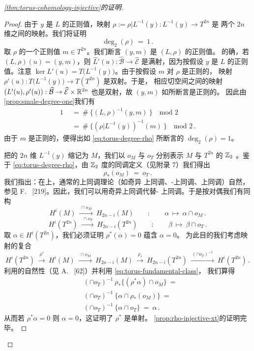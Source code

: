 \begin{proof}[\cref*{thm:torus-cohomology-injective}的证明]
\begin{proof}
由于 $y$ 是 $L$ 的正则值，映射 $\rho:=\rho|L^{-1}(y):L^{-1}(y)\to T^{2n}$ 是%
两个 $2n$ 维\trCompact\trManifold{}之间的映射。我们将证明
\begin{equation}\label{eq:torus-degree-rho}
\deg_{2}(\rho)\ =\ 1\,.
\end{equation}
取 $\rho$ 的一个正则值 $m\in T^{2n}$。我们断言 $(y,m)$ 是 $(L,\rho)$ 的正则值。%
的确，若 $(L,\rho)(u)=(y,m)$，则 $\widehat{L}'(u):\widehat{\mathcal{B}}\to%
\widehat{\mathcal{E}}$ 是满射，因为按假设 $y$ 是 $L$ 的正则值。注意%
$\ker L'(u)=T\bigl(L^{-1}(y)\bigr)$。由于按假设 $m$ 对 $\rho$ 是正则的，%
\trLinear{}映射 $\rho'(u):T\bigl(L^{-1}(y)\bigr)\to T(T^{2n})$ 是双射。于是，%
相应切空间之间的\trLinear{}映射 $(L'(u),\rho'(u)):\widehat{\mathcal{B}}\to%
\widehat{\mathcal{E}}\times\R^{2n}$ 也是双射，故 $(y,m)$ 如所断言是正则的。%
因此由\cref{prop:smale-degree-one}我们有
\[
\begin{aligned}
1\ \ &=\ \#\ \bigl\{(L,\rho)^{-1}(y,m)\ \bigr\}\quad\text{mod }2\\
&=\ \#\ \bigl\{(\rho|L^{-1}(y))^{-1}(m)\ \bigr\}\quad\text{mod }2\,.
\end{aligned}
\]
由于 $m$ 是正则的，便得出如 \eqref{eq:torus-degree-rho} 所断言的%
$\deg_{2}(\rho)=1$。

把\trCompact{}的 $2n$ 维\trManifold{} $L^{-1}(y)$ 缩记为 $M$，我们以 $o_{M}$%
与 $o_{T}$ 分别表示 $M$ 与 $T^{2n}$ 的 $\mathbb{Z}_{2}$ \trFundamentalClass。鉴于%
\eqref{eq:torus-degree-rho}，由 $\mathbb{Z}_{2}$ 度的同调定义（见附录 7）我们得出
\begin{equation}\label{eq:torus-fundamental-class}
\rho_{*}(o_{M})\ =\ o_{T}\,.
\end{equation}
我们指出：在\trSmooth\trCompact\trManifold{}上，通常的上同调理论（如奇异%
上同调、\trAlexander-\trSpanier{}上同调、\trCech{}上同调）自然\trIsomorphic，%
参见 F.~\trWarner{} [219]。因此，我们可以用奇异上同调代替\trAlexander-\trSpanier{}%
上同调。于是按\trPoincare{}对偶我们有同构
\[
H^{i}(M)\ \xrightarrow{\ \cap o_{M}\ }\ H_{2n-i}(M)\qquad:\qquad%
\alpha\ \mapsto\ \alpha\cap o_{M}\,.
\]
\[
H^{i}(T^{2n})\ \xrightarrow{\ \cap o_{T}\ }\ H_{2n-i}(T^{2n})\qquad:\qquad%
\beta\ \mapsto\ \beta\cap o_{T}\,.
\]
取 $\alpha\in H^{i}(T^{2n})$，我们必须证明 $\rho^{*}(\alpha)=0$ 蕴含 $\alpha=0$。%
为此目的我们考虑映射的复合
\[
H^{i}(T^{2n})\ \xrightarrow{\ \rho^{*}\ }\ H^{i}(M)\ \xrightarrow{\ \cap o_{M}\ }\ %
H_{2n-i}(M)\ \xrightarrow{\ \rho_{*}\ }\ H_{2n-i}(T^{2n})\ %
\xrightarrow{\ (\cap o_{T})^{-1}\ }\ H^{i}(T^{2n})\,.
\]
利用\trCapProduct{}的自然性（见 A.~\trDold{} [62]）并利用 \eqref{eq:torus-fundamental-class}，%
我们算得
\[
\begin{aligned}
&(\cap o_{T})^{-1}\ \rho_{*}\bigl\{(\rho^{*}\alpha)\cap o_{M}\bigr\}\ =\\
&(\cap o_{T})^{-1}\ \bigl\{\alpha\cap\rho_{*}(o_{M})\bigr\}\ =\\
&(\cap o_{T})^{-1}\ \bigl\{\alpha\cap o_{T}\bigr\}\ =\ \alpha\,.
\end{aligned}
\]
从而若 $\rho^{*}\alpha=0$ 则 $\alpha=0$，这证明了 $\rho^{*}$ 是单射。%
\cref{prop:rho-injective-xt}的证明完毕。
\end{proof}


\end{proof}
